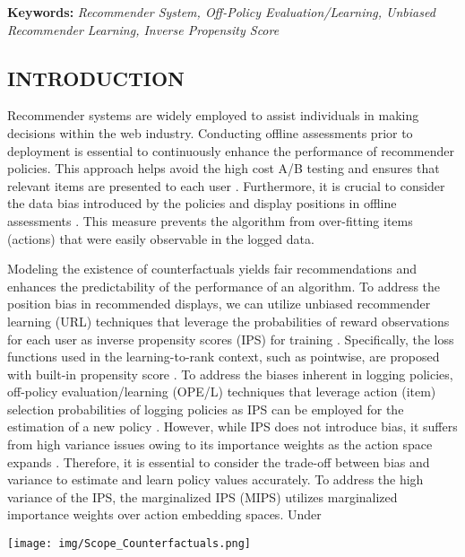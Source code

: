 \documentclass[a4paper,10pt]{article} %
\begin{document}

{\noindent \fontsize{9pt}{9pt}\selectfont \textbf{Keywords:} \textit{Recommender System, Off-Policy Evaluation/Learning, Unbiased Recommender Learning, Inverse Propensity Score}}

\begin{multicols}{2}



\section{INTRODUCTION}

Recommender systems are widely employed to assist individuals in making decisions within the web industry. Conducting offline assessments prior to deployment is essential to continuously enhance the performance of recommender policies. This approach helps avoid the high cost A/B testing and ensures that relevant items are presented to each user \cite{saito2020open,chen2019top,gruson2019offline}. Furthermore, it is crucial to consider the data bias introduced by the policies and display positions in offline assessments \cite{chen2023bias}. This measure prevents the algorithm from over-fitting items (actions) that were easily observable in the logged data.

Modeling the existence of counterfactuals yields fair recommendations and enhances the predictability of the performance of an algorithm. To address the position bias in recommended displays, we can utilize unbiased recommender learning (URL) techniques that leverage the probabilities of reward observations for each user as inverse propensity scores (IPS) for training \cite{schnabel2016recommendations,saito2020unbiased}. Specifically, the loss functions used in the learning-to-rank context, such as pointwise, are proposed with built-in propensity score \cite{saito2020unbiased}. To address the biases inherent in logging policies, off-policy evaluation/learning (OPE/L) techniques that leverage action (item) selection probabilities of logging policies as IPS can be employed for the estimation of a new policy \cite{swaminathan2015counterfactual,saito2022off,li2018offline}. However, while IPS does not introduce bias, it suffers from high variance issues owing to its importance weights as the action space expands \cite{saito2022off,li2018offline}. Therefore, it is essential to consider the trade-off between bias and variance to estimate and learn policy values accurately. To address the high variance of the IPS, the marginalized IPS (MIPS) utilizes marginalized importance weights over action embedding spaces. Under
\noindent
\begin{minipage}{\linewidth}
    \centering
    \texttt{[image: img/Scope\_Counterfactuals.png]}
    \label{fig:scope_counterfactuals}
\end{minipage}
\vspace{1mm}


\end{multicols}
\end{document}
